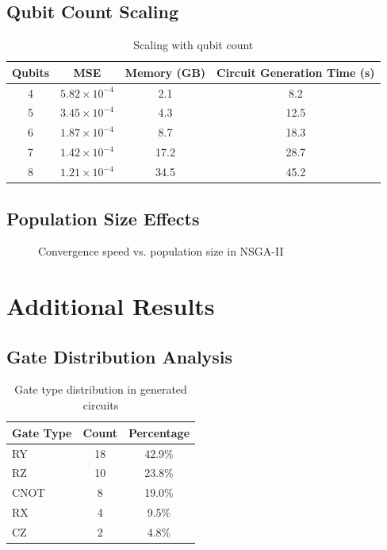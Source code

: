 \documentclass[11pt,a4paper,uplatex,dvipdfmx]{jsarticle}
\begin{document}
\subsection{Qubit Count Scaling}

\begin{table}[h]
\centering
\caption{Scaling with qubit count}
\begin{tabular}{cccc}
\toprule
Qubits & MSE & Memory (GB) & Circuit Generation Time (s) \\
\midrule
4 & $5.82 \times 10^{-4}$ & 2.1 & 8.2 \\
5 & $3.45 \times 10^{-4}$ & 4.3 & 12.5 \\
6 & $1.87 \times 10^{-4}$ & 8.7 & 18.3 \\
7 & $1.42 \times 10^{-4}$ & 17.2 & 28.7 \\
8 & $1.21 \times 10^{-4}$ & 34.5 & 45.2 \\
\bottomrule
\end{tabular}
\end{table}

\subsection{Population Size Effects}

\begin{figure}[H]
\centering
{}
\caption{Convergence speed vs. population size in NSGA-II}
\end{figure}

\section{Additional Results}

\subsection{Gate Distribution Analysis}

\begin{table}[h]
\centering
\caption{Gate type distribution in generated circuits}
\begin{tabular}{lcc}
\toprule
Gate Type & Count & Percentage \\
\midrule
RY & 18 & 42.9\% \\
RZ & 10 & 23.8\% \\
CNOT & 8 & 19.0\% \\
RX & 4 & 9.5\% \\
CZ & 2 & 4.8\% \\
\bottomrule
\end{tabular}
\end{table}
\end{document}

